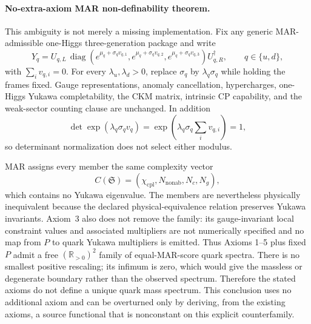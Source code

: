 \documentclass[11pt]{article}
\begin{document}
\paragraph{No-extra-axiom MAR non-definability theorem.}
This ambiguity is not merely a missing implementation.  Fix any generic MAR-admissible one-Higgs
three-generation package and write
\[
Y_q=U_{q,L}\,\operatorname{diag}
\!\left(e^{\mu_q+\sigma_qv_{q,1}},e^{\mu_q+\sigma_qv_{q,2}},
e^{\mu_q+\sigma_qv_{q,3}}\right)U_{q,R}^{\dagger},
\qquad q\in\{u,d\},
\]
with \(\sum_i v_{q,i}=0\).  For every \(\lambda_u,\lambda_d>0\), replace
\(\sigma_q\) by \(\lambda_q\sigma_q\) while holding the frames fixed.  Gauge representations,
anomaly cancellation, hypercharges, one-Higgs Yukawa completability, the CKM matrix, intrinsic CP
capability, and the weak-sector counting clause are unchanged.  In addition
\[
\det\exp(\lambda_q\sigma_qv_q)
=\exp\!\left(\lambda_q\sigma_q\sum_i v_{q,i}\right)=1,
\]
so determinant normalization does not select either modulus.

MAR assigns every member the same complexity vector
\[
C(\mathfrak S)=(\chi_{\mathrm{cpl}},N_{\mathrm{nonab}},N_c,N_g),
\]
which contains no Yukawa eigenvalue.  The members are nevertheless physically inequivalent because
the declared physical-equivalence relation preserves Yukawa invariants.  Axiom~3 also does not
remove the family: its gauge-invariant local constraint values and associated multipliers are not
numerically specified and no map from \(P\) to quark Yukawa multipliers is emitted.  Thus Axioms
1--5 plus fixed \(P\) admit a free \((\mathbb R_{>0})^2\) family of equal-MAR-score quark spectra.
There is no smallest positive rescaling; its infimum is zero, which would give the massless or
degenerate boundary rather than the observed spectrum.  Therefore the stated axioms do not define
a unique quark mass spectrum.  This conclusion uses no additional axiom and can be overturned only
by deriving, from the existing axioms, a source functional that is nonconstant on this explicit
counterfamily.
\end{document}
